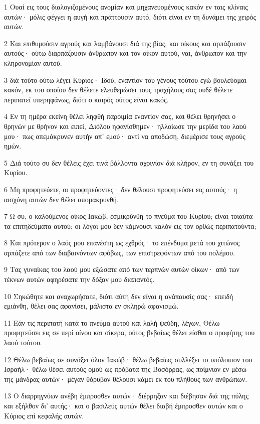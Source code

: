 \par 1 Ουαί εις τους διαλογιζομένους ανομίαν και μηχανευομένους κακόν εν ταις κλίναις αυτών· μόλις φέγγει η αυγή και πράττουσιν αυτό, διότι είναι εν τη δυνάμει της χειρός αυτών.
\par 2 Και επιθυμούσιν αγρούς και λαμβάνουσι διά της βίας, και οίκους και αρπάζουσιν αυτούς· ούτω διαρπάζουσιν άνθρωπον και τον οίκον αυτού, ναι, άνθρωπον και την κληρονομίαν αυτού.
\par 3 διά τούτο ούτω λέγει Κύριος· Ιδού, εναντίον του γένους τούτου εγώ βουλεύομαι κακόν, εκ του οποίου δεν θέλετε ελευθερώσει τους τραχήλους σας ουδέ θέλετε περιπατεί υπερηφάνως, διότι ο καιρός ούτος είναι κακός.
\par 4 Εν τη ημέρα εκείνη θέλει ληφθή παροιμία εναντίον σας, και θέλει θρηνήσει ο θρηνών με θρήνον και ειπεί, Διόλου ηφανίσθημεν· ηλλοίωσε την μερίδα του λαού μου· πως απεμάκρυνεν αυτήν απ' εμού· αντί να αποδώση, διεμέρισε τους αγρούς ημών.
\par 5 Διά τούτο συ δεν θέλεις έχει τινά βάλλοντα σχοινίον διά κλήρον, εν τη συνάξει του Κυρίου.
\par 6 Μη προφητεύετε, οι προφητεύοντες· δεν θέλουσι προφητεύσει εις αυτούς· η αισχύνη αυτών δεν θέλει απομακρυνθή.
\par 7 Ω συ, ο καλούμενος οίκος Ιακώβ, εσμικρύνθη το πνεύμα του Κυρίου; είναι τοιαύτα τα επιτηδεύματα αυτού; οι λόγοι μου δεν κάμνουσι καλόν εις τον ορθώς περιπατούντα;
\par 8 Και πρότερον ο λαός μου επανέστη ως εχθρός· το επένδυμα μετά του χιτώνος αρπάζετε από των διαβαινόντων αφόβως, των επιστρεφόντων από του πολέμου.
\par 9 Τας γυναίκας του λαού μου εξώσατε από των τερπνών αυτών οίκων· από των τέκνων αυτών αφηρέσατε την δόξαν μου διαπαντός.
\par 10 Σηκώθητε και αναχωρήσατε, διότι αύτη δεν είναι η ανάπαυσίς σας· επειδή εμιάνθη, θέλει σας αφανίσει, μάλιστα εν σκληρώ αφανισμώ.
\par 11 Εάν τις περιπατή κατά το πνεύμα αυτού και λαλή ψεύδη, λέγων, Θέλω προφητεύσει εις σε περί οίνου και σίκερα, ούτος βεβαίως θέλει είσθαι ο προφήτης του λαού τούτου.
\par 12 Θέλω βεβαίως σε συνάξει όλον Ιακώβ· θέλω βεβαίως συλλέξει το υπόλοιπον του Ισραήλ· θέλω θέσει αυτούς ομού ως πρόβατα της Βοσόρρας, ως ποίμνιον εν μέσω της μάνδρας αυτών· μέγαν θόρυβον θέλουσι κάμει εκ του πλήθους των ανθρώπων.
\par 13 Ο διαρρηγνύων ανέβη έμπροσθεν αυτών· διέρρηξαν και διέβησαν διά της πύλης και εξήλθον δι' αυτής· και ο βασιλεύς αυτών θέλει διαβή έμπροσθεν αυτών και ο Κύριος επί κεφαλής αυτών.

